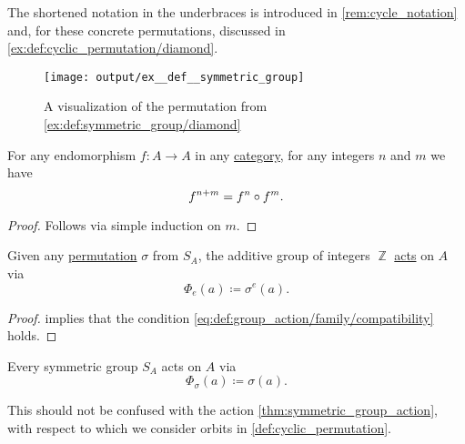 \begin{example}
\begin{thmenum}
    The shortened notation in the underbraces is introduced in \cref{rem:cycle_notation} and, for these concrete permutations, discussed in \cref{ex:def:cyclic_permutation/diamond}.

    \begin{figure}
      \centering
      \texttt{[image: output/ex\_\_def\_\_symmetric\_group]}
      \caption{A visualization of the permutation from \cref{ex:def:symmetric_group/diamond}}
      \label{fig:ex:def:symmetric_group/diamond}
    \end{figure}
  \end{thmenum}
\end{example}

\begin{lemma}\label{thm:sum_of_powers_in_composition}
  For any endomorphism \( f: A \to A \) in any \hyperref[def:category]{category}, for any integers \( n \) and \( m \) we have
  \begin{equation*}
    f^{n + m} = f^n \bincirc f^m.
  \end{equation*}
\end{lemma}
\begin{proof}
  Follows via simple induction on \( m \).
\end{proof}

\begin{proposition}\label{thm:symmetric_group_action}
  Given any \hyperref[def:symmetric_group]{permutation} \( \sigma \) from \( S_A \), the additive group of integers \( \BbbZ \) \hyperref[def:group_action]{acts} on \( A \) via
  \begin{equation*}
    \Phi_e(a) \coloneqq \sigma^e(a).
  \end{equation*}
\end{proposition}
\begin{proof}
   implies that the condition \eqref{eq:def:group_action/family/compatibility} holds.
\end{proof}

\begin{remark}\label{rem:symmetric_group_actions}
  Every symmetric group \( S_A \) acts on \( A \) via
  \begin{equation*}
    \Phi_\sigma(a) \coloneqq \sigma(a).
  \end{equation*}

  This should not be confused with the action \cref{thm:symmetric_group_action}, with respect to which we consider orbits in \cref{def:cyclic_permutation}.
\end{remark}

